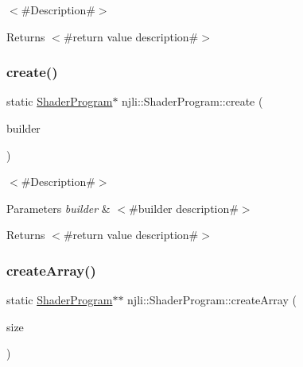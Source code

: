 $<$\#\+Description\#$>$

\begin{DoxyReturn}{Returns}
$<$\#return value description\#$>$ 
\end{DoxyReturn}
\mbox{\label{classnjli_1_1_shader_program_a425842368a91fb2d82d550a36d3d440a}} 
\subsubsection{\texorpdfstring{create()}{create()}\hspace{0.1cm}{\footnotesize\ttfamily [3/3]}}
{\footnotesize\ttfamily static \mbox{\hyperlink{classnjli_1_1_shader_program}{Shader\+Program}}$\ast$ njli\+::\+Shader\+Program\+::create (\begin{DoxyParamCaption}\item[{const \mbox{\hyperlink{classnjli_1_1_shader_program_builder}{Shader\+Program\+Builder}} \&}]{builder }\end{DoxyParamCaption})\hspace{0.3cm}{\ttfamily [static]}}

$<$\#\+Description\#$>$


\begin{DoxyParams}{Parameters}
{\em builder} & $<$\#builder description\#$>$\\
\hline
\end{DoxyParams}
\begin{DoxyReturn}{Returns}
$<$\#return value description\#$>$ 
\end{DoxyReturn}
\mbox{\label{classnjli_1_1_shader_program_a78a8831d8b2c160381b3f00b5bd0a9f1}} 
\subsubsection{\texorpdfstring{create\+Array()}{createArray()}}
{\footnotesize\ttfamily static \mbox{\hyperlink{classnjli_1_1_shader_program}{Shader\+Program}}$\ast$$\ast$ njli\+::\+Shader\+Program\+::create\+Array (\begin{DoxyParamCaption}\item[{const \mbox{\hyperlink{_util_8h_a10e94b422ef0c20dcdec20d31a1f5049}{u32}}}]{size }\end{DoxyParamCaption})\hspace{0.3cm}{\ttfamily [static]}}

